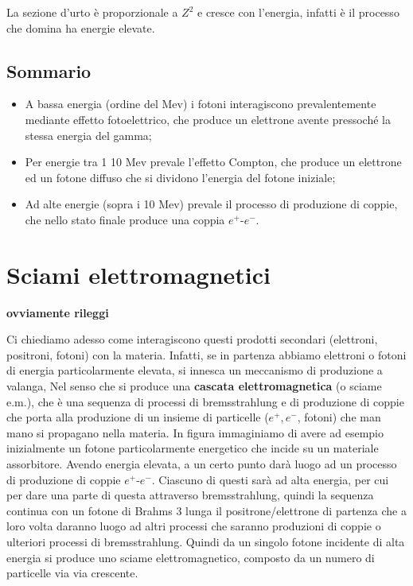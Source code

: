 La sezione d'urto è proporzionale a $Z^2$ e cresce con l'energia, infatti è il processo che domina ha energie elevate.

\subsection{Sommario}

\begin{itemize}
    \item A bassa energia (ordine del Mev) i fotoni interagiscono prevalentemente mediante effetto fotoelettrico, che produce un elettrone avente pressoché la stessa energia del gamma;

    \item Per energie tra 1 10 Mev prevale l'effetto Compton, che produce un elettrone ed un fotone diffuso che si dividono l'energia del fotone iniziale;
    \item Ad alte energie (sopra i 10 Mev) prevale il processo di produzione di coppie, che nello stato finale produce una coppia $e^+$-$e^-$.
\end{itemize}


\section{Sciami elettromagnetici}

\textbf{ovviamente rileggi}

Ci chiediamo adesso come interagiscono questi prodotti secondari (elettroni, positroni, fotoni) con la materia. Infatti, se in partenza abbiamo elettroni o fotoni di energia particolarmente elevata, si innesca un meccanismo di produzione a valanga, Nel senso che si produce una \textbf{cascata elettromagnetica} (o sciame e.m.), che è una sequenza di processi di bremsstrahlung e di produzione di coppie che porta alla produzione di un insieme di particelle ($e^+, e^-$, fotoni) che man mano si propagano nella materia. In figura immaginiamo di avere ad esempio inizialmente un fotone particolarmente energetico che incide su un materiale assorbitore. Avendo energia elevata, a un certo punto darà luogo ad un processo di produzione di coppie $e^+$-$e^-$. Ciascuno di questi sarà ad alta energia, per cui per dare una parte di questa attraverso bremsstrahlung, quindi la sequenza continua con un fotone di Brahms 3 lunga il positrone/elettrone di partenza che a loro volta daranno luogo ad altri processi che saranno produzioni di coppie o ulteriori processi di bremsstrahlung. Quindi da un singolo fotone incidente di alta energia si produce uno sciame elettromagnetico, composto da un numero di particelle via via crescente.

